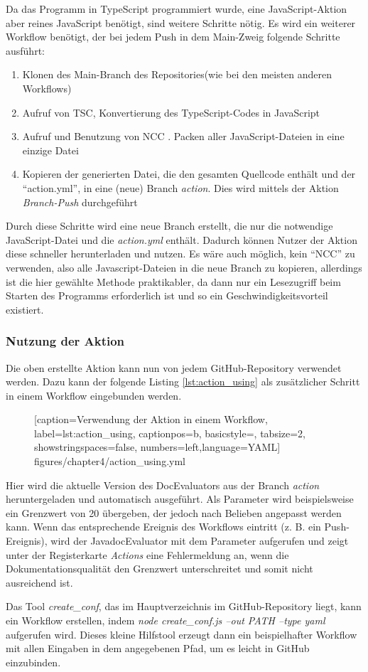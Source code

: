 \bigskip
Da das Programm in TypeScript programmiert wurde, eine JavaScript-Aktion aber reines JavaScript benötigt, sind weitere Schritte nötig. Es wird ein weiterer Workflow benötigt, der bei jedem Push in dem Main-Zweig folgende Schritte ausführt:
\begin{enumerate}
    \item Klonen des Main-Branch des Repositories(wie bei den meisten anderen Workflows)
    \item Aufruf von TSC, Konvertierung des TypeScript-Codes in JavaScript
    \item Aufruf und Benutzung von NCC \cite{ncc}. Packen aller JavaScript-Dateien in eine einzige Datei
    \item Kopieren der generierten Datei, die den gesamten Quellcode enthält und der \enquote{action.yml}, in eine (neue) Branch \textit{action}. Dies wird mittels der Aktion \textit{Branch-Push}\cite{Branch-Push} durchgeführt
\end{enumerate}
Durch diese Schritte wird eine neue Branch erstellt, die nur die notwendige JavaScript-Datei und die \textit{action.yml} enthält. Dadurch können Nutzer der Aktion diese schneller herunterladen und nutzen. Es wäre auch möglich, kein \enquote{NCC} zu verwenden, also alle Javascript-Dateien in die neue Branch zu kopieren, allerdings ist die hier gewählte Methode praktikabler, da dann nur ein Lesezugriff beim Starten des Programms erforderlich ist und so ein Geschwindigkeitsvorteil existiert. 

\subsubsection{Nutzung der Aktion}

Die oben erstellte Aktion kann nun von jedem GitHub-Repository verwendet werden. Dazu kann der folgende Listing \ref{lst:action_using} als zusätzlicher Schritt in einem Workflow eingebunden werden. 
\begin{figure} [htbp]

[caption={Verwendung der Aktion in einem Workflow},
label={lst:action_using},
captionpos=b, basicstyle=\footnotesize, tabsize=2, showstringspaces=false,  numbers=left,language=YAML]
{figures/chapter4/action_using.yml}
\end{figure}

Hier wird die aktuelle Version des DocEvaluators aus der Branch \textit{action} heruntergeladen und automatisch ausgeführt. Als Parameter wird beispielsweise ein Grenzwert von 20 übergeben, der jedoch nach Belieben angepasst werden kann. Wenn das entsprechende Ereignis des Workflows eintritt (z. B. ein Push-Ereignis), wird der JavadocEvaluator mit dem Parameter aufgerufen und zeigt unter der Registerkarte \textit{Actions} eine Fehlermeldung an, wenn die Dokumentationsqualität den Grenzwert unterschreitet und somit nicht ausreichend ist.

Das Tool \textit{create\_conf}, das im Hauptverzeichnis im GitHub-Repository liegt, kann ein Workflow erstellen, indem \textit{node create\_conf.js --out PATH --type yaml} aufgerufen wird. Dieses kleine Hilfstool erzeugt dann ein beispielhafter Workflow mit allen Eingaben in dem angegebenen Pfad, um es leicht in GitHub einzubinden.
